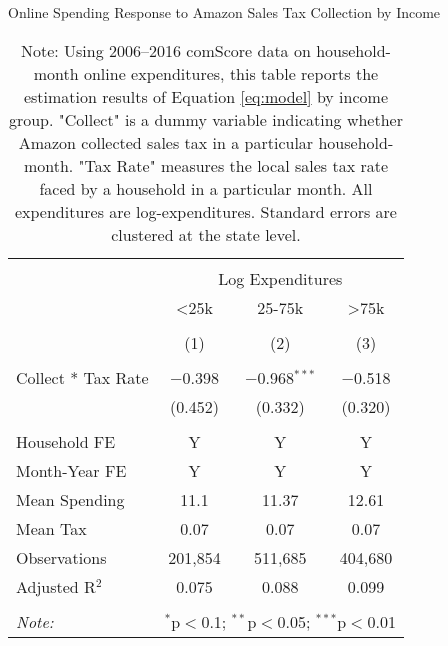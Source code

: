 
\begin{table}[!htbp] \centering
  \caption{Online Spending Response to Amazon Sales Tax Collection by Income}
  \label{tab:appendixSpendingIncome}
\begin{tabular}{@{\extracolsep{5pt}}lccc}
\\[-1.8ex]\hline
\hline \\[-1.8ex]
 & \multicolumn{3}{c}{Log Expenditures} \\
\cline{2-4}
 & <25k & 25-75k & >75k \\
\\[-1.8ex] & (1) & (2) & (3)\\
\hline \\[-1.8ex]
 Collect * Tax Rate & $-$0.398 & $-$0.968$^{***}$ & $-$0.518 \\
  & (0.452) & (0.332) & (0.320) \\
 \hline \\[-1.8ex]
Household FE & Y & Y & Y \\
Month-Year FE & Y & Y & Y \\
Mean Spending & 11.1 & 11.37 & 12.61 \\
Mean Tax & 0.07 & 0.07 & 0.07 \\
Observations & 201,854 & 511,685 & 404,680 \\
Adjusted R$^{2}$ & 0.075 & 0.088 & 0.099 \\
\hline
\hline \\[-1.8ex]
\textit{Note:}  & \multicolumn{3}{l}{$^{*}$p$<$0.1; $^{**}$p$<$0.05; $^{***}$p$<$0.01} \\
\end{tabular}
\caption*{Note: Using 2006--2016 comScore data on household-month online expenditures, this table reports the estimation results of Equation \ref{eq:model} by income group. "Collect" is a dummy variable indicating whether Amazon collected sales tax in a particular household-month. "Tax Rate" measures the local sales tax rate faced by a household in a particular month. All expenditures are log-expenditures. Standard errors are clustered at the state level.}
\end{table}
